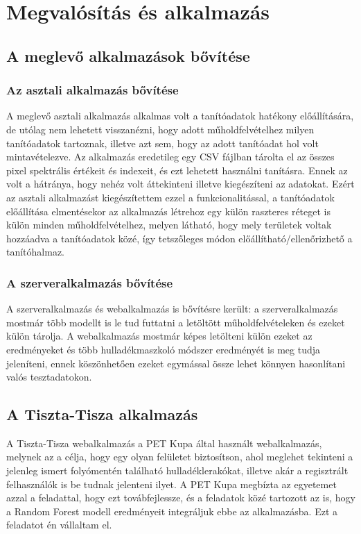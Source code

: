 \chapter{Megvalósítás és alkalmazás}
\label{ch:impl}

\section{A meglevő alkalmazások bővítése}
\label{ch:application-improvement}

\subsection {Az asztali alkalmazás bővítése}

A meglevő asztali alkalmazás alkalmas volt a tanítóadatok hatékony előállítására, de utólag nem lehetett visszanézni, hogy adott műholdfelvételhez milyen tanítóadatok tartoznak, illetve azt sem, hogy az adott tanítóadat hol volt mintavételezve. Az alkalmazás eredetileg egy CSV fájlban \cite{rfc4180} tárolta el az összes pixel spektrális értékeit és indexeit, és ezt lehetett használni tanításra. Ennek az volt a hátránya, hogy nehéz volt áttekinteni illetve kiegészíteni az adatokat. Ezért az asztali alkalmazást kiegészítettem ezzel a funkcionalitással, a tanítóadatok előállítása elmentésekor az alkalmazás létrehoz egy külön raszteres réteget is külön minden műholdfelvételhez, melyen látható, hogy mely területek voltak hozzáadva a tanítóadatok közé, így tetszőleges módon előállítható/ellenőrizhető a tanítóhalmaz.

\subsection {A szerveralkalmazás bővítése}

A szerveralkalmazás és webalkalmazás is bővítésre került: a szerveralkalmazás mostmár több modellt is le tud futtatni a letöltött műholdfelvételeken és ezeket külön tárolja. A webalkalmazás mostmár képes letölteni külön ezeket az eredményeket és több hulladékmaszkoló módszer eredményét is meg tudja jeleníteni, ennek köszönhetően ezeket egymással össze lehet könnyen hasonlítani valós tesztadatokon. 

\section{A Tiszta-Tisza alkalmazás}

A Tiszta-Tisza webalkalmazás  a PET Kupa által használt webalkalmazás, melynek az a célja, hogy egy olyan felületet biztosítson, ahol meglehet tekinteni a jelenleg ismert folyómentén található hulladéklerakókat, illetve akár a regisztrált felhasználók is be tudnak jelenteni ilyet. A PET Kupa megbízta az egyetemet azzal a feladattal, hogy ezt továbfejlessze, és a feladatok közé tartozott az is, hogy a Random Forest modell eredményeit integráljuk ebbe az alkalmazásba. Ezt a feladatot én vállaltam el.

